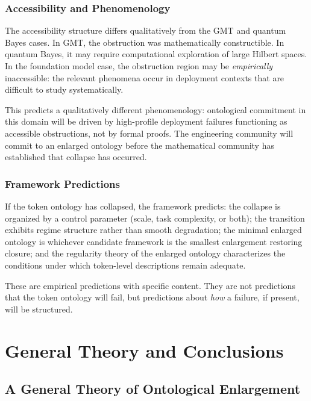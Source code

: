 \documentclass[12pt,oneside]{book}
\theoremstyle{plain}
\theoremstyle{definition}
\theoremstyle{remark}
\begin{document}
\section{Accessibility and Phenomenology}

The accessibility structure differs qualitatively from the GMT and quantum
Bayes cases. In GMT, the obstruction was mathematically constructible. In
quantum Bayes, it may require computational exploration of large Hilbert
spaces. In the foundation model case, the obstruction region may be
\emph{empirically} inaccessible: the relevant phenomena occur in deployment
contexts that are difficult to study systematically.

This predicts a qualitatively different phenomenology: ontological commitment
in this domain will be driven by high-profile deployment failures functioning
as accessible obstructions, not by formal proofs. The engineering community
will commit to an enlarged ontology before the mathematical community has
established that collapse has occurred.

\section{Framework Predictions}

If the token ontology has collapsed, the framework predicts: the collapse is
organized by a control parameter (scale, task complexity, or both); the
transition exhibits regime structure rather than smooth degradation; the
minimal enlarged ontology is whichever candidate framework is the smallest
enlargement restoring closure; and the regularity theory of the enlarged
ontology characterizes the conditions under which token-level descriptions
remain adequate.

These are empirical predictions with specific content. They are not
predictions that the token ontology will fail, but predictions about
\emph{how} a failure, if present, will be structured.

\part{General Theory and Conclusions}

\chapter{A General Theory of Ontological Enlargement}
\end{document}
